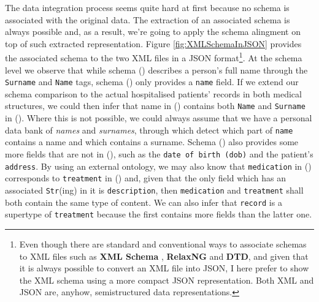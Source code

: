 The data integration process seems quite hard at first because no schema is associated with the original data. 
The extraction of an associated schema  is always possible \cite{BaaziziLCGS17} and, as a result, we're going to apply the schema alingment on top of such extracted representation. Figure \vref{fig:XMLSchemaInJSON} provides the associated schema to the two XML files in a JSON format\footnote{Even though there are standard and conventional ways to associate schemas to XML files such as \textbf{XML Schema} \cite{VlistXS}, \textbf{RelaxNG} and \textbf{DTD}, and given that it is always possible to convert an XML file into JSON, I here prefer to show the XML schema using a more compact JSON representation. Both XML and JSON are, anyhow, semistructured data representations.}. At the schema level we observe that while schema () describes a person's full name through the \texttt{Surname} and \texttt{Name} tags,  schema () only provides a \texttt{name} field. 
If we extend our schema comparison to the actual hospitalised patients’ records in both medical structures, we could then infer that name in  () contains both \texttt{Name} and \texttt{Surname} in (). Where this is not possible, we could always assume that we have a personal data bank of \textit{names} and \textit{surnames}, through which detect which part of \texttt{name} contains a name and which contains a surname. Schema () also provides some more fields that are not in (), such as the \texttt{date of birth (dob)} and the patient's \texttt{address}. By using an external ontology, we may also know that \texttt{medication} in () corresponds to \texttt{treatment} in () and, given that the only field which has an associated  \texttt{Str}(ing) in it is \texttt{description}, then \texttt{medication} and \texttt{treatment} shall both contain the same type of content. We can also infer that \texttt{record} is a supertype of \texttt{treatment} because the first contains more fields than the latter one.


